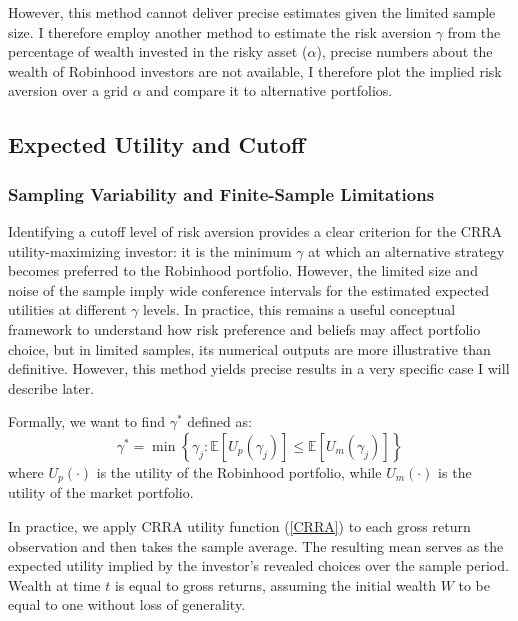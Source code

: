 However, this method cannot deliver precise estimates given the limited sample size. 
I therefore employ another method to estimate the risk aversion $\gamma$ from the percentage of wealth invested in the risky asset ($\alpha$), 
precise numbers about the wealth of Robinhood investors are not available, I therefore plot the implied risk aversion over a grid $\alpha$ and compare it to alternative portfolios.

\subsection{Expected Utility and Cutoff}
\subsubsection{Sampling Variability and Finite-Sample Limitations}
Identifying a cutoff level of risk aversion provides a clear criterion for the CRRA utility-maximizing investor: 
it is the minimum $\gamma$ at which an alternative strategy becomes preferred to the Robinhood portfolio.
However, the limited size and noise of the sample imply wide conference intervals for the estimated expected utilities at different $\gamma$ levels.
In practice, this remains a useful conceptual framework to understand how risk preference and beliefs may affect portfolio choice, but in limited samples, its numerical outputs are more illustrative than definitive.
However, this method yields precise results in a very specific case I will describe later. 

Formally, we want to find $\gamma^*$ defined as:
\begin{equation}
    \gamma^* = \min\left\{ \gamma_j : \mathbb{E}[U_p(\gamma_j)] \leq \mathbb{E}[U_m(\gamma_j)] \right\}
    \label{gamma_cutoff}
\end{equation}
where $U_p(\cdot)$ is the utility of the Robinhood portfolio, while $U_m(\cdot)$ is the utility of the market portfolio.

In practice, we apply CRRA utility function (\ref{CRRA}) to each gross return observation and then takes the sample average.
The resulting mean serves as the expected utility implied by the investor's revealed choices over the sample period.
Wealth at time $t$ is equal to gross returns, assuming the initial wealth $W$ to be equal to one without loss of generality.


